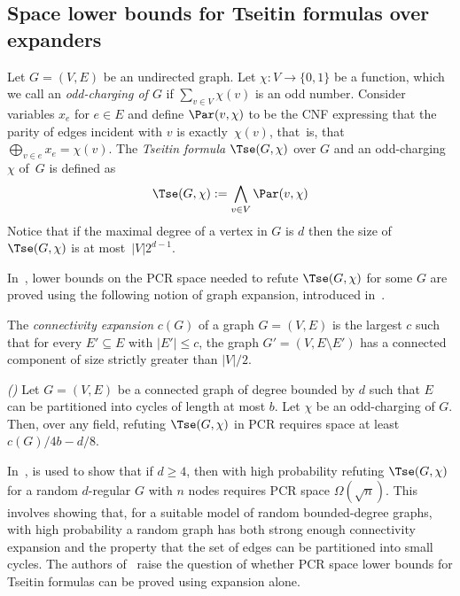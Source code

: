 \documentclass{toc}
\begin{document}
\subsection{Space lower bounds for Tseitin formulas over expanders}

Let $G = (V, E)$ be an undirected graph.
Let $\chi: V \rightarrow \{0, 1\}$ be a function, which we call an \emph{odd-charging
of $G$}  if $\sum_{v\in V} \chi(v)$ is an odd number. Consider variables $x_e$ for $e\in E$ and define 
$\Par(v,\chi)$ to be the CNF 
expressing 
that the parity of edges incident with $v$ is exactly~$\chi(v)$, that~is, that ~$\bigoplus_{v \in e}x_e= \chi(v)$. 
The \emph{Tseitin formula} $\Tse(G,\chi)$ over $G$ and an odd-charging 
$\chi$ of~$G$ is defined as 
$$
\Tse(G,\chi) := \bigwedge_{v\in V} \Par(v,\chi)
$$
Notice that if the maximal degree of a vertex in $G$ is $d$ then the size of $\Tse(G,\chi)$ is at most~$|V|2^{d-1}$.

In~\cite{DBLP:conf/icalp/FilmusLMNV13}, lower bounds on the PCR space needed to refute 
$\Tse(G,\chi)$ for some $G$ are proved using the following notion of graph expansion, 
introduced in~\cite{ABRW}.


\begin{definition} 
The \emph{connectivity expansion} $c(G)$ of a graph $G = (V, E)$ is the largest $c$ such that for every $E' \subseteq E$ with $|E'|\leq c$, the graph
$G' = (V, E \setminus E')$ has a connected component of size strictly greater than $|V|/2$.
\end{definition}

\begin{theorem} \emph{(\cite{DBLP:conf/icalp/FilmusLMNV13})}\label{thm:c(G)-bound} 
Let $G = (V, E)$ be a connected graph of degree bounded by $d$  such that $E$ can be partitioned into cycles of length at
most $b$. Let $\chi$ be an odd-charging of $G$.
Then, over any field, refuting $\Tse(G, \chi)$ in PCR requires space 
at least ${c(G)}/{4b} - {d}/{8}$.
\end{theorem}


In~\cite{DBLP:conf/icalp/FilmusLMNV13},  is used to show that if $d \ge 4$,
then with high probability refuting $\Tse(G,\chi)$ for a random $d$-regular $G$ with $n$ nodes
requires PCR space $\Omega(\sqrt{n})$. This involves showing 
that, for a suitable model of random bounded-degree graphs,
with high probability a random graph has both strong enough connectivity expansion 
and the property that the set of edges can be partitioned into small cycles.
The authors of~\cite{DBLP:conf/icalp/FilmusLMNV13} raise the question of whether 
PCR space lower bounds for Tseitin formulas can be proved using expansion alone. 
\end{document}
